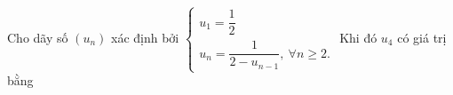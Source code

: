 \begin{ex}
Cho dãy số $(u_n)$ xác định bởi $\begin{cases}u_1=\dfrac12\\ u_n=\dfrac{1}{2-u_{n-1}},\ \forall n\ge2.\end{cases}$ Khi đó $u_4$ có giá trị bằng
\end{ex}
